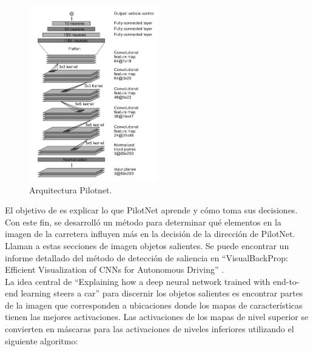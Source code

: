 \begin{figure}
\begin{center}
	\includegraphics[width=0.5\textwidth]{figures/Estado_arte/pilotnet.png}
   \caption{Arquitectura Pilotnet.}
	\label{fig.pilotnet}
\end{center}
\end{figure}

El objetivo de \cite{explaining-end2end} es explicar lo que PilotNet aprende y cómo toma sus decisiones. Con este fin, se desarrolló un método para determinar qué elementos en la imagen de la carretera influyen más en la decisión de la dirección de PilotNet. Llaman a estas secciones de imagen objetos salientes. Se puede encontrar un informe detallado del método de detección de saliencia en ``VisualBackProp: Efficient Visualization of CNNs for Autonomous Driving'' \cite{visual}.\\


La idea central de ``Explaining  how  a  deep  neural network trained with end-to-end learning steers a car'' \cite{explaining-end2end} para discernir los objetos salientes es encontrar partes de la imagen que corresponden a ubicaciones donde los mapas de características tienen las mejores activaciones. Las activaciones de los mapas de nivel superior se convierten en máscaras para las activaciones de niveles inferiores utilizando el siguiente algoritmo:

